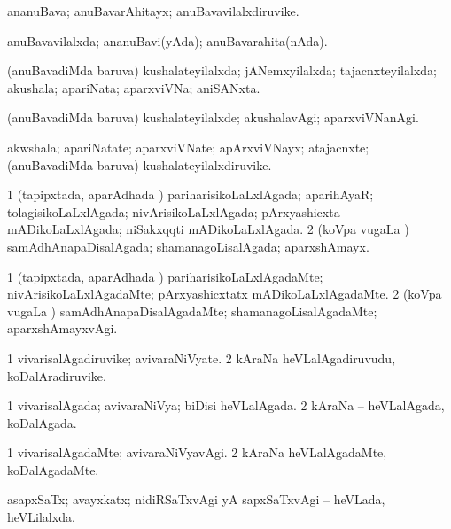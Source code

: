\bentry
{}
\gl{\nA}
\bmng
ananuBava; anuBavarAhitayx; anuBavavilalxdiruvike. 
\emng
\eentry

\bentry
{}
\gl{\gu}
\bmng
anuBavavilalxda; ananuBavi(yAda); anuBavarahita(nAda). 
\emng
\eentry

\bentry
{}
\gl{\gu}
\bmng
(anuBavadiMda baruva) kushalateyilalxda; jANemxyilalxda; tajacnxteyilalxda; akushala; apariNata; aparxviVNa; aniSANxta. 
\emng
\eentry

\bentry
{}
\gl{\kirxvi}
\bmng
(anuBavadiMda baruva) kushalateyilalxde; akushalavAgi; aparxviVNanAgi. 
\emng
\eentry

\bentry
{}
\gl{\nA}
\bmng
akwshala; apariNatate; aparxviVNate; apArxviVNayx; atajacnxte; (anuBavadiMda baruva) kushalateyilalxdiruvike. 
\emng
\eentry

\bentry
{}
\gl{\gu}
\bmng
\bnum
\num{1} (tapipxtada, aparAdhada \vi) pariharisikoLaLxlAgada; aparihAyaR; tolagisikoLaLxlAgada; nivArisikoLaLxlAgada; pArxyashicxta mADikoLaLxlAgada; niSakxqqti mADikoLaLxlAgada. 
\num{2} (koVpa \mo vugaLa \vi) samAdhAnapaDisalAgada; shamanagoLisalAgada; aparxshAmayx. 
\enum
\emng
\eentry

\bentry
{}
\gl{\kirxvi}
\bmng
\bnum
\num{1} (tapipxtada, aparAdhada \vi) pariharisikoLaLxlAgadaMte; nivArisikoLaLxlAgadaMte; pArxyashicxtatx mADikoLaLxlAgadaMte. 
\num{2} (koVpa \mo vugaLa \vi) samAdhAnapaDisalAgadaMte; shamanagoLisalAgadaMte; aparxshAmayxvAgi. 
\enum
\emng
\eentry

\bentry
{}
\gl{\nA}
\bmng
\bnum
\num{1} vivarisalAgadiruvike; avivaraNiVyate. 
\num{2} kAraNa heVLalAgadiruvudu, koDalAradiruvike. 
\enum
\emng
\eentry

\bentry
{}
\gl{\gu}
\bmng
\bnum
\num{1} vivarisalAgada; avivaraNiVya; biDisi heVLalAgada. 
\num{2} kAraNa -- heVLalAgada, koDalAgada. 
\enum
\emng
\eentry

\bentry
{}
\gl{\kirxvi}
\bmng
\bnum
\num{1} vivarisalAgadaMte; avivaraNiVyavAgi. 
\num{2} kAraNa heVLalAgadaMte, koDalAgadaMte. 
\enum
\emng
\eentry

\bentry
{}
\gl{\gu}
\bmng
asapxSaTx; avayxkatx; nidiRSaTxvAgi yA sapxSaTxvAgi -- heVLada, heVLilalxda. 
\emng
\eentry

